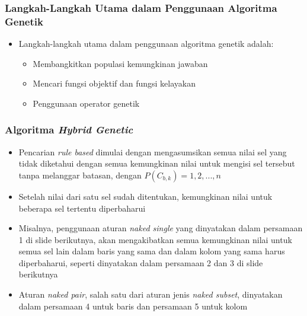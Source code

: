 \documentclass{beamer}
\begin{document}

\begin{frame}
\frametitle{Langkah-Langkah Utama dalam Penggunaan Algoritma Genetik}
\begin{itemize}
\item Langkah-langkah utama dalam penggunaan algoritma genetik adalah:
	\begin{itemize}
	\item Membangkitkan populasi kemungkinan jawaban
	\item Mencari fungsi objektif dan fungsi kelayakan
	\item Penggunaan operator genetik
	\end{itemize}
\end{itemize}
\end{frame}


\begin{frame}
\frametitle{Algoritma \textit{Hybrid Genetic}}
\begin{itemize}
\item Pencarian \textit{rule based} dimulai dengan mengasumsikan semua nilai sel yang tidak diketahui dengan semua kemungkinan nilai untuk mengisi sel tersebut tanpa melanggar batasan, dengan \begin{math}P(C_{b,k}) = {1, 2, ..., n}\end{math}
\item Setelah nilai dari satu sel sudah ditentukan, kemungkinan nilai untuk beberapa sel tertentu diperbaharui \item Misalnya, penggunaan aturan \textit{naked single} yang dinyatakan dalam persamaan 1 di slide berikutnya, akan mengakibatkan semua kemungkinan nilai untuk semua sel lain dalam baris yang sama dan dalam kolom yang sama harus diperbaharui, seperti dinyatakan dalam persamaan 2 dan 3 di slide berikutnya
\item Aturan \textit{naked pair}, salah satu dari aturan jenis \textit{naked subset}, dinyatakan dalam persamaan 4 untuk baris dan persamaan 5 untuk kolom
\end{itemize}
\end{frame}
\end{document}
